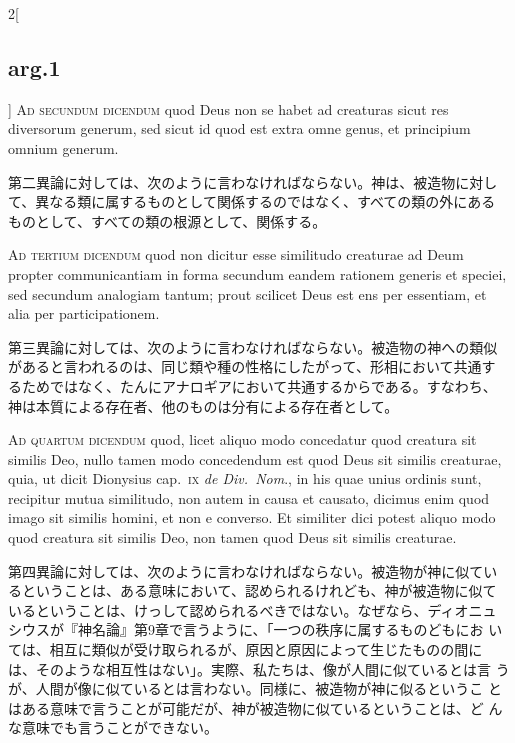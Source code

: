 \documentclass[paper=a4paper,fontsize=10pt,jafontsize=9pt,titlepage]{jlreq}
\begin{document}
\begin{paracol}{2}[\subsection{arg.1}]
{\scshape Ad secundum dicendum} quod Deus non se habet ad creaturas
sicut res diversorum generum, sed sicut id quod est extra omne genus,
et principium omnium generum.

\switchcolumn

第二異論に対しては、次のように言わなければならない。神は、被造物に対し
て、異なる類に属するものとして関係するのではなく、すべての類の外にある
ものとして、すべての類の根源として、関係する。

\switchcolumn*[\subsection{ad.3}]

{\scshape Ad tertium dicendum} quod non dicitur esse similitudo
creaturae ad Deum propter communicantiam in forma secundum eandem
rationem generis et speciei, sed secundum analogiam tantum; prout
scilicet Deus est ens per essentiam, et alia per participationem.

\switchcolumn

第三異論に対しては、次のように言わなければならない。被造物の神への類似
があると言われるのは、同じ類や種の性格にしたがって、形相において共通す
るためではなく、たんにアナロギアにおいて共通するからである。すなわち、
神は本質による存在者、他のものは分有による存在者として。

\switchcolumn*[\subsection{ad.4}]

{\scshape Ad quartum dicendum} quod, licet aliquo modo concedatur quod
creatura sit similis Deo, nullo tamen modo concedendum est quod Deus
sit similis creaturae, quia, ut dicit Dionysius cap.~{\scshape ix}
{\itshape de Div.~Nom}., in his quae unius ordinis sunt, recipitur
mutua similitudo, non autem in causa et causato, dicimus enim quod
imago sit similis homini, et non e converso. Et similiter dici potest
aliquo modo quod creatura sit similis Deo, non tamen quod Deus sit
similis creaturae.

\switchcolumn

第四異論に対しては、次のように言わなければならない。被造物が神に似てい
るということは、ある意味において、認められるけれども、神が被造物に似て
いるということは、けっして認められるべきではない。なぜなら、ディオニュ
シウスが『神名論』第9章で言うように、「一つの秩序に属するものどもにお
いては、相互に類似が受け取られるが、原因と原因によって生じたものの間に
は、そのような相互性はない」。実際、私たちは、像が人間に似ているとは言
うが、人間が像に似ているとは言わない。同様に、被造物が神に似るというこ
とはある意味で言うことが可能だが、神が被造物に似ているということは、ど
んな意味でも言うことができない。

\end{paracol}
\end{document}
